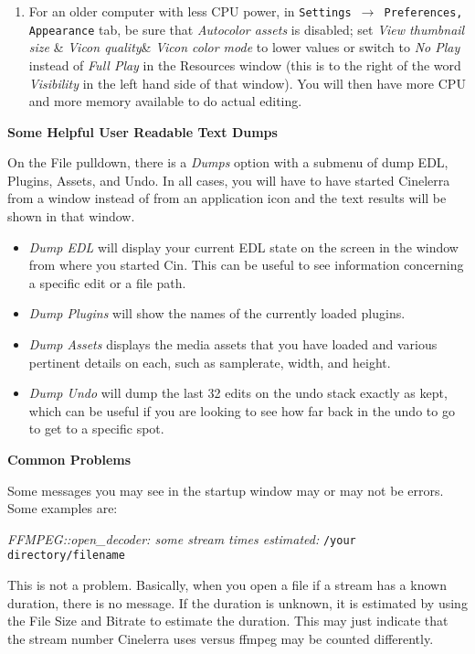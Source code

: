 \begin{enumerate}
	\item For an older computer with less CPU power, in \texttt{Settings $\rightarrow$ Preferences, Appearance} tab, be sure that \textit{Autocolor assets }is disabled; set \textit{View thumbnail size} \& \textit{Vicon quality}\& \textit{Vicon color mode} to lower values or switch to \textit{No Play} instead of \textit{Full Play} in the Resources window (this is to the right of the word \textit{Visibility} in the left hand side of that window). You will then have more CPU and more memory available to do actual editing.
\end{enumerate}

\textbf{Some Helpful User Readable Text Dumps}

On the File pulldown, there is a \textit{Dumps} option with a submenu of dump EDL, Plugins, Assets, and Undo. In all cases, you will have to have started Cinelerra from a window instead of from an application icon and
the text results will be shown in that window.

\begin{itemize}[nosep]
\item \textit{Dump EDL} will display your current EDL state on the screen in the window from where you started Cin. This can be useful to see information concerning a specific edit or a file path.
\item \textit{Dump Plugins} will show the names of the currently loaded plugins.
\item \textit{Dump Assets} displays the media assets that you have loaded and various pertinent details on each, such as samplerate, width, and height.
\item \textit{Dump Undo }will dump the last 32 edits on the undo stack exactly as kept, which can be useful if you are looking to see how far back in the undo to go to get to a specific spot.
\end{itemize}

\textbf{Common Problems}

Some messages you may see in the startup window may or may not be errors. Some examples are:
\bigskip

\textit{FFMPEG::open\_decoder: some stream times estimated:} \quad \texttt{/your directory/filename}

This is not a problem. Basically, when you open a file if a stream has a known duration, there is no message. If the duration is unknown, it is estimated by using the File Size and Bitrate to estimate the duration. This may just indicate that the stream number Cinelerra uses versus ffmpeg may be counted differently.
\bigskip

